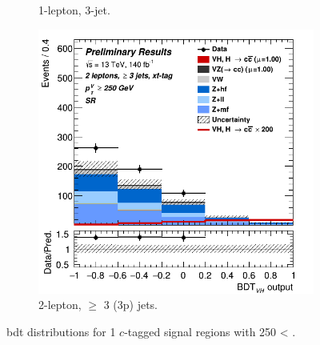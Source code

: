 \begin{figure}[h!]
\begin{subfigure}[b]{0.32\textwidth}
      \caption{1-lepton, 3-jet.}
      \label{fig:plots_VHcc_ex_1L_SR_1C}
  \end{subfigure}
  \begin{subfigure}[b]{0.32\textwidth}
    \centering
    \includegraphics[width=\textwidth]{Images/VH/Own_fit/prefit_VHcc/Region_distmva_BMin250_DSR_J3_TTypext_incJet1_T2_L2_Y6051_Prefit.png}
    \caption{2-lepton, $\geq$ 3 (3p) jets.}
    \label{fig:plots_VHcc_ex_2L_SR_1C}
\end{subfigure}
  \caption{\gls{bdt} distributions for 1 $c$-tagged signal regions with 250 < \ptv.}
  \label{fig:plots_VHcc_ex_SR_1C}
\end{figure} 

